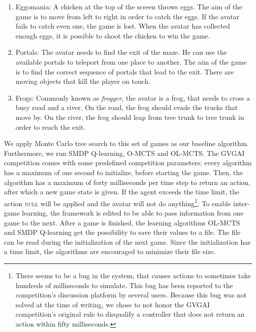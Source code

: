 \begin{enumerate}
	\item Eggomania:
		A chicken at the top of the screen throws eggs. The aim of the game is
		to move from left to right in order to catch the eggs. If the avatar
		fails to catch even one, the game is lost. When the avatar
		has collected enough eggs, it is possible to shoot the chicken to win
		the game.
	\item Portals:
		The avatar needs to find the exit of the maze. He can use the available
		portals to teleport from one place to another. The aim of the game is to
		find the correct sequence of portals that lead to the exit. There are
		moving objects that kill the player on touch.
	\item Frogs:
		Commonly known as \textit{frogger}, the avatar is a frog, that needs to
		cross a busy road and a river. On the road, the frog should evade the
		trucks that move by. On the river, the frog should leap from tree trunk
		to tree trunk in order to reach the exit.
\end{enumerate}

We apply Monte Carlo tree search to this set of games as our baseline algorithm.
Furthermore, we run SMDP Q-learning, O-MCTS and OL-MCTS.  The GVGAI competition
comes with some predefined competition parameters: every algorithm has a maximum
of one second to initialize, before starting the game. Then, the algorithm has a
maximum of forty milliseconds per time step to return an action, after which a
new game state is given. If the agent exceeds the time limit, the action
\textsc{null} will be applied and the avatar will not do anything\footnote{There
	seems to be a bug in the system, that causes actions to sometimes take
	hundreds of milliseconds to simulate. This bug has been reported to the
	competition's discussion platform by several users. Because this bug was not
	solved at the time of writing, we chose to not honor the GVGAI competition's
	original rule to disqualify a controller that does not return an action
within fifty milliseconds.}. To enable inter-game learning, the framework is
edited to be able to pass information from one game to the next. After a game is
finished, the learning algorithms OL-MCTS and SMDP Q-learning get the
possibility to save their values to a file. The file can be read during the
initialization of the next game. Since the initialization has a time limit, the
algorithms are encouraged to minimize their file size.

